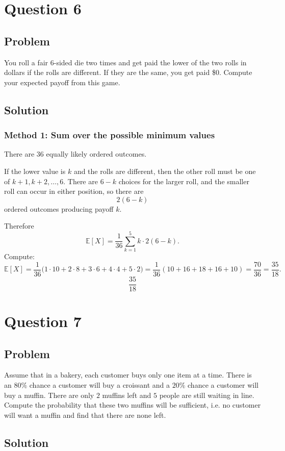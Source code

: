 \documentclass[12pt]{article}
\begin{document}
\newpage
\section{Question 6}
\subsection{Problem}
You roll a fair $6$-sided die two times and get paid the lower of the two rolls in dollars if the rolls are different. If they are the same, you get paid \$0. Compute your expected payoff from this game.

\subsection{Solution}
\subsubsection{Method 1: Sum over the possible minimum values}
There are $36$ equally likely ordered outcomes.

If the lower value is $k$ and the rolls are different, then the other roll must be one of $k+1,k+2,\dots,6$. There are $6-k$ choices for the larger roll, and the smaller roll can occur in either position, so there are
\[
2(6-k)
\]
ordered outcomes producing payoff $k$.

Therefore
\[
\mathbb{E}[X]
=
\frac{1}{36}\sum_{k=1}^{5} k\cdot 2(6-k).
\]
Compute:
\[
\mathbb{E}[X]
=
\frac{1}{36}\bigl(1\cdot 10 + 2\cdot 8 + 3\cdot 6 + 4\cdot 4 + 5\cdot 2\bigr)
=
\frac{1}{36}(10+16+18+16+10)
=
\frac{70}{36}
=
\frac{35}{18}.
\]
\[
\boxed{\frac{35}{18}}
\]

\newpage
\section{Question 7}
\subsection{Problem}
Assume that in a bakery, each customer buys only one item at a time. There is an $80\%$ chance a customer will buy a croissant and a $20\%$ chance a customer will buy a muffin. There are only $2$ muffins left and $5$ people are still waiting in line. Compute the probability that these two muffins will be sufficient, i.e. no customer will want a muffin and find that there are none left.

\subsection{Solution}
\end{document}
